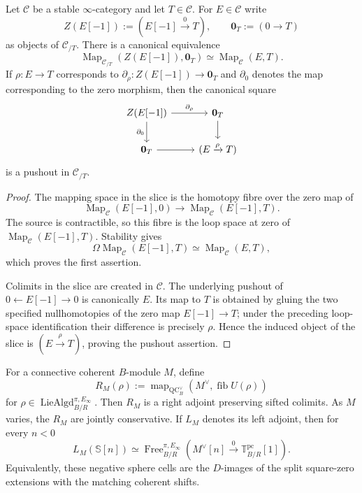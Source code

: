 \begin{lemma}
\label{lem:bnla-anchored-cell-attachment}
Let $\mathcal C$ be a stable $\infty$-category and let $T\in\mathcal C$.
For $E\in\mathcal C$ write
\[
    Z(E[-1]):=(E[-1]\xrightarrow{0}T),
    \qquad
    \mathbf 0_T:=(0\to T)
\]
as objects of $\mathcal C_{/T}$.  There is a canonical equivalence
\[
\boxed{
    \operatorname{Map}_{\mathcal C_{/T}}
    \left(Z(E[-1]),\mathbf 0_T\right)
    \simeq
    \operatorname{Map}_{\mathcal C}(E,T).}
\]
If $\rho:E\to T$ corresponds to
$\partial_\rho:Z(E[-1])\to\mathbf 0_T$ and
$\partial_0$ denotes the map corresponding to the zero morphism, then the
canonical square
\[
\begin{tikzcd}
Z(E[-1]) \arrow[r,"\partial_\rho"] \arrow[d,"\partial_0"'] &
\mathbf 0_T \arrow[d]\\
\mathbf 0_T \arrow[r] &
(E\xrightarrow{\rho}T)
\end{tikzcd}
\]
is a pushout in $\mathcal C_{/T}$.
\end{lemma}

\begin{proof}
The mapping space in the slice is the homotopy fibre over the zero map of
\[
    \operatorname{Map}_{\mathcal C}(E[-1],0)
    \longrightarrow
    \operatorname{Map}_{\mathcal C}(E[-1],T).
\]
The source is contractible, so this fibre is the loop space at zero of
$\operatorname{Map}_{\mathcal C}(E[-1],T)$.  Stability gives
\[
    \Omega\operatorname{Map}_{\mathcal C}(E[-1],T)
    \simeq
    \operatorname{Map}_{\mathcal C}(E,T),
\]
which proves the first assertion.

Colimits in the slice are created in $\mathcal C$.  The underlying pushout of
$0\leftarrow E[-1]\to0$ is canonically $E$.  Its map to $T$ is obtained by
gluing the two specified nullhomotopies of the zero map $E[-1]\to T$; under
the preceding loop-space identification their difference is precisely
$\rho$.  Hence the induced object of the slice is
$(E\xrightarrow{\rho}T)$, proving the pushout assertion.
\end{proof}

\begin{lemma}
\label{lem:bnla-spectral-cellular-hypotheses}
For a connective coherent $B$-module $M$, define
\[
    R_M(\rho)
    :=
    \operatorname{map}_{\operatorname{QC}^{\vee}_B}
    \left(
        M^\vee,\operatorname{fib}U(\rho)
    \right)
\]
for
$\rho\in\operatorname{LieAlgd}^{\pi,E_\infty}_{B/R}$.  Then $R_M$ is a
right adjoint preserving sifted colimits.  As $M$ varies, the $R_M$ are jointly
conservative.  If $L_M$ denotes its left adjoint, then for every $n<0$
\[
\boxed{
    L_M(\mathbb S[n])
    \simeq
    \operatorname{Free}^{\pi,E_\infty}_{B/R}
    \left(M^\vee[n]\xrightarrow{0}
    \mathbb T^{\mathrm{pc}}_{B/R}[1]\right).}
\]
Equivalently, these negative sphere cells are the $D$-images of the split
square-zero extensions with the matching coherent shifts.
\end{lemma}

